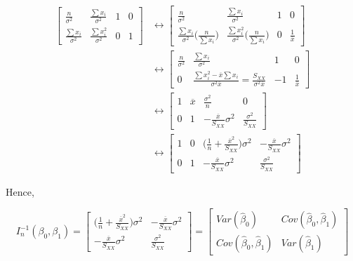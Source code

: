 \documentclass[]{book}
\theoremstyle{definition}
\theoremstyle{definition}
\theoremstyle{definition}
\theoremstyle{remark}
\begin{document}
\begin{equation*}
  \begin{split}
    \left[
    \begin{array}{cc|cc}
      \frac{n}{\sigma^2} & \frac{\sum x_i}{\sigma^2} & 1 & 0 \\
      \frac{\sum x_i}{\sigma^2} & \frac{\sum x_i^2}{\sigma^2} & 0 & 1
    \end{array}
    \right] & \leftrightarrow \left[
    \begin{array}{cc|cc}
      \frac{n}{\sigma^2} & \frac{\sum x_i}{\sigma^2} & 1 & 0 \\
      \frac{\sum x_i}{\sigma^2}\Big(\frac{n}{\sum x_i} \Big) & \frac{\sum x_i^2}{\sigma^2}\Big(\frac{n}{\sum x_i} \Big) & 0 & \frac{1}{\overline{x}}
    \end{array}
    \right] \\
    & \leftrightarrow \left[
    \begin{array}{cc|cc}
      \frac{n}{\sigma^2} & \frac{\sum x_i}{\sigma^2} & 1 & 0 \\
      0 & \frac{\sum x_i^2 - \overline{x}\sum x_i}{\sigma^2\overline{x}} = \frac{S_{XX}}{\sigma^2\overline{x}} & -1 & \frac{1}{\overline{x}}
    \end{array}
    \right] \\
    & \leftrightarrow \left[
    \begin{array}{cc|cc}
      1 & \overline{x} & \frac{\sigma^2}{n} & 0 \\
      0 & 1 & -\frac{\overline{x}}{S_{XX}}\sigma^2 & \frac{\sigma^2}{S_{XX}}
    \end{array}
    \right] \\
    & \leftrightarrow \left[
    \begin{array}{cc|cc}
      1 & 0 & \bigg(\frac{1}{n} + \frac{\overline{x}^2}{S_{XX}} \bigg)\sigma^2 & -\frac{\overline{x}}{S_{XX}}\sigma^2 \\
      0 & 1 & -\frac{\overline{x}}{S_{XX}}\sigma^2 & \frac{\sigma^2}{S_{XX}}
    \end{array}
    \right]
  \end{split}
\end{equation*}

Hence,

\[
I_n^{-1}(\beta_0, \beta_1) = \begin{bmatrix}
  \bigg(\frac{1}{n} + \frac{\overline{x}^2}{S_{XX}} \bigg)\sigma^2 & -\frac{\overline{x}}{S_{XX}}\sigma^2 \\
  -\frac{\overline{x}}{S_{XX}}\sigma^2 & \frac{\sigma^2}{S_{XX}}
\end{bmatrix} = \begin{bmatrix}
  Var(\hat\beta_0) & Cov(\hat\beta_0, \hat\beta_1) \\
  Cov(\hat\beta_0, \hat\beta_1) & Var(\hat\beta_1)
\end{bmatrix}
\]
\end{document}
